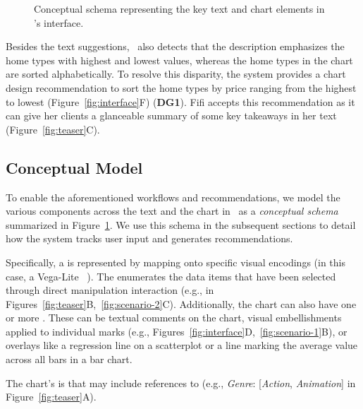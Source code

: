\begin{figure}[t!]
    \centering
    
    \caption{Conceptual schema representing the key text and chart elements in \pluto's interface.}
    \label{fig:schema}
\end{figure}

Besides the text suggestions, \pluto~also detects that the description emphasizes the home types with highest and lowest values, whereas the home types in the chart are sorted alphabetically.
To resolve this disparity, the system provides a chart design recommendation to sort the home types by price ranging from the highest to lowest (Figure~\ref{fig:interface}F) (\textbf{DG1}).
Fifi accepts this recommendation as it can give her clients a glanceable summary of some key takeaways in her text (Figure~\ref{fig:teaser}C).

\subsection{Conceptual Model}

To enable the aforementioned workflows and recommendations, we model the various components across the text and the chart in \pluto~as a \emph{conceptual schema} summarized in Figure~\ref{fig:schema}.
We use this schema in the subsequent sections to detail how the system tracks user input and generates recommendations.

Specifically, a  is represented by mapping  onto specific visual encodings (in this case, a Vega-Lite ~\cite{satyanarayan2016vega}).
The  enumerates the data items that have been selected through direct manipulation interaction (e.g., in Figures~\ref{fig:teaser}B,~\ref{fig:scenario-2}C).
Additionally, the chart can also have one or more .
These can be textual comments on the chart, visual embellishments applied to individual marks (e.g., Figures~\ref{fig:interface}D,~\ref{fig:scenario-1}B), or overlays like a regression line on a scatterplot or a line marking the average value across all bars in a bar chart.

The chart's  is  that may include references to  (e.g., \textit{Genre}: [\textit{Action}, \textit{Animation}] in Figure~\ref{fig:teaser}A).

